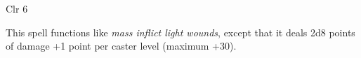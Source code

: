 
\begin{description*}
\item[Level:] Clr 6
\end{description*}

This spell functions like \textit{mass inflict light wounds}, except that it deals
2d8 points of damage +1 point per caster level (maximum +30).